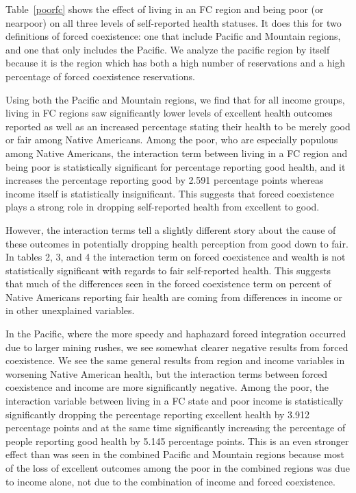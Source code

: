 \documentclass[12pt]{article}
\begin{document}
Table~\ref{poorfc} shows the effect of living in an FC region and being poor (or nearpoor) on all three levels of self-reported health statuses. It does this for two definitions of forced coexistence: one that include Pacific and Mountain regions, and one that only includes the Pacific.  We analyze the pacific region by itself because it is the region which has both a high number of reservations and a high percentage of forced coexistence reservations.

Using both the Pacific and Mountain regions, we find that for all income groups, living in FC regions saw significantly lower levels of excellent health outcomes reported as well as an increased percentage stating their health to be merely good or fair among Native Americans.
Among the poor, who are especially populous among Native Americans, the interaction term between living in a FC region and being poor is statistically significant for percentage reporting good health, and it increases the percentage reporting good by 2.591 percentage points whereas income itself is statistically insignificant.
This suggests that forced coexistence plays a strong role in dropping self-reported health from excellent to good.

However, the interaction terms tell a slightly different story about the cause of these outcomes in potentially dropping health perception from good down to fair. 
In tables 2, 3, and 4 the interaction term on forced coexistence and wealth is not statistically significant with regards to fair self-reported health. 
This suggests that much of the differences seen in the forced coexistence term on percent of Native Americans reporting fair health are coming from differences in income or in other unexplained variables.  

In the Pacific, where the more speedy and haphazard forced integration occurred due to larger mining rushes, we see somewhat clearer negative results from forced coexistence. 
We see the same general results from region and income variables in worsening Native American health, but the interaction terms between forced coexistence and income are more significantly negative.  
Among the poor, the interaction variable between living in a FC state and poor income is statistically significantly dropping the percentage reporting excellent health by 3.912 percentage points and at the same time significantly increasing the percentage of people reporting good health by 5.145 percentage points.  
This is an even stronger effect than was seen in the combined Pacific and Mountain regions because most of the loss of excellent outcomes among the poor in the combined regions was due to income alone, not due to the combination of income and forced coexistence.
\end{document}

